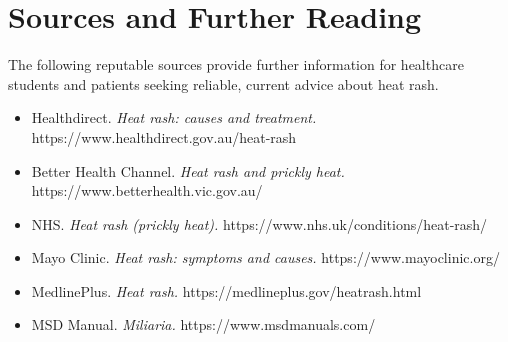 \section*{Sources and Further Reading}
The following reputable sources provide further information for healthcare students and patients seeking reliable, current advice about heat rash.

\begin{itemize}
    \item Healthdirect. \textit{Heat rash: causes and treatment.} https://www.healthdirect.gov.au/heat-rash
    \item Better Health Channel. \textit{Heat rash and prickly heat.} https://www.betterhealth.vic.gov.au/
    \item NHS. \textit{Heat rash (prickly heat).} https://www.nhs.uk/conditions/heat-rash/
    \item Mayo Clinic. \textit{Heat rash: symptoms and causes.} https://www.mayoclinic.org/
    \item MedlinePlus. \textit{Heat rash.} https://medlineplus.gov/heatrash.html
    \item MSD Manual. \textit{Miliaria.} https://www.msdmanuals.com/
\end{itemize}
